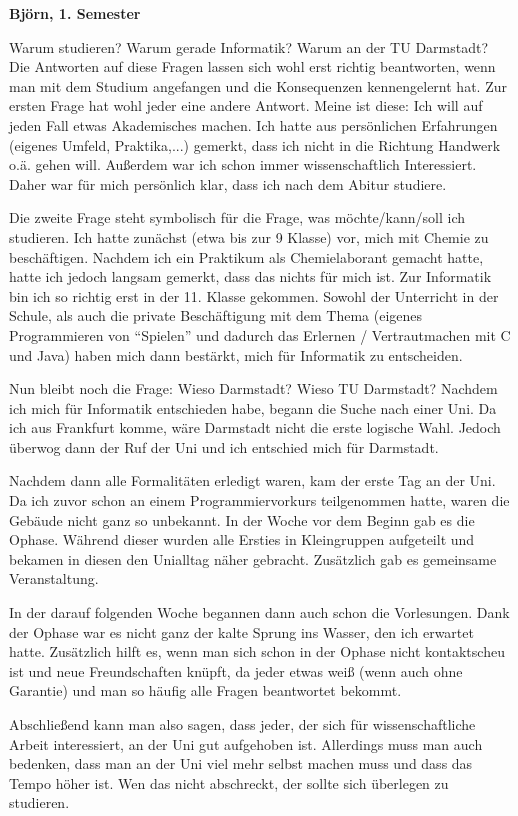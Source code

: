 {\textbf{Björn, 1. Semester}

Warum studieren? Warum gerade Informatik? Warum an der TU Darmstadt? Die Antworten auf diese Fragen lassen sich wohl erst richtig beantworten, wenn man mit dem Studium angefangen und die Konsequenzen kennengelernt hat. Zur ersten Frage hat wohl jeder eine andere Antwort. Meine ist diese: Ich will auf jeden Fall etwas Akademisches machen. Ich hatte aus persönlichen Erfahrungen (eigenes Umfeld, Praktika,...) gemerkt, dass ich nicht in die Richtung Handwerk o.ä. gehen will. Außerdem war ich schon immer wissenschaftlich Interessiert. Daher war für mich persönlich klar, dass ich nach dem Abitur studiere.

Die zweite Frage steht symbolisch für die Frage, was möchte/kann/soll ich studieren. Ich hatte zunächst (etwa bis zur 9 Klasse) vor, mich mit Chemie zu beschäftigen. Nachdem ich ein Praktikum als Chemielaborant gemacht hatte, hatte ich jedoch langsam gemerkt, dass das nichts für mich ist. Zur Informatik bin ich so richtig erst in der 11. Klasse gekommen. Sowohl der Unterricht in der Schule, als auch die private Beschäftigung mit dem Thema (eigenes Programmieren von "`Spielen"' und dadurch das Erlernen / Vertrautmachen mit C und Java) haben mich dann bestärkt, mich für Informatik zu entscheiden.

Nun bleibt noch die Frage: Wieso Darmstadt? Wieso TU Darmstadt? Nachdem ich mich für Informatik entschieden habe, begann die Suche nach einer Uni. Da ich aus Frankfurt komme, wäre Darmstadt nicht die erste logische Wahl. Jedoch überwog dann der Ruf der Uni und ich entschied mich für Darmstadt. 

Nachdem dann alle Formalitäten erledigt waren, kam der erste Tag an der Uni. Da ich zuvor schon an einem Programmiervorkurs teilgenommen hatte, waren die Gebäude nicht ganz so unbekannt. In der Woche vor dem Beginn gab es die Ophase. Während dieser wurden alle Ersties in Kleingruppen aufgeteilt und bekamen in diesen den Unialltag näher gebracht. Zusätzlich gab es gemeinsame Veranstaltung.

In der darauf folgenden Woche begannen dann auch schon die Vorlesungen. Dank der Ophase war es nicht ganz der kalte Sprung ins Wasser, den ich erwartet hatte. Zusätzlich hilft es, wenn man sich schon in der Ophase nicht kontaktscheu ist und neue Freundschaften knüpft, da jeder etwas weiß (wenn auch ohne Garantie) und man so häufig alle Fragen beantwortet bekommt.

Abschließend kann man also sagen, dass jeder, der sich für wissenschaftliche Arbeit interessiert, an der Uni gut aufgehoben ist. Allerdings muss man auch bedenken, dass man an der Uni viel mehr selbst machen muss und dass das Tempo höher ist. Wen das nicht abschreckt, der sollte sich überlegen zu studieren.\\

}
